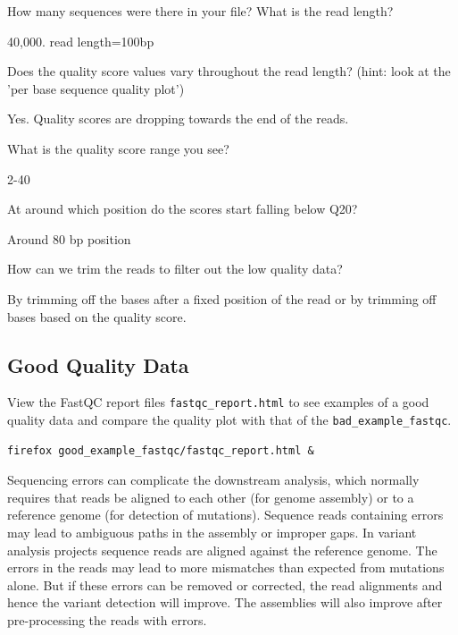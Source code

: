 \begin{questions}
How many sequences were there in your file? What is the read length?
\begin{answer}
40,000. read length=100bp
\end{answer}

Does the quality score values vary throughout the read length?
(hint: look at the 'per base sequence quality plot')
\begin{answer}
Yes. Quality scores are dropping towards the end of the reads.
\end{answer}

What is the quality score range you see?
\begin{answer}
2-40
\end{answer}

At around which position do the scores start falling below Q20? 
\begin{answer}
Around 80 bp position
\end{answer}


How can we trim the reads to filter out the low quality data?
\begin{answer}
By trimming off the bases after a fixed position of the read or by trimming off
bases based on the quality score.
\end{answer}
\end{questions}

\begin{bonus}
\subsection{Good Quality Data}
View the FastQC report files \texttt{fastqc\_report.html} to see examples of a good
quality data and compare the quality plot with that of the \texttt{bad\_example\_fastqc}.

\begin{lstlisting}
firefox good_example_fastqc/fastqc_report.html &
\end{lstlisting}
\end{bonus}

\begin{note}
Sequencing errors can complicate the downstream analysis, which normally
requires that reads be aligned to each other (for genome assembly) or to a
reference genome (for detection of mutations). Sequence reads containing errors
may lead to ambiguous paths in the assembly or improper gaps. In variant
analysis projects sequence reads are aligned against the reference genome. The
errors in the reads may lead to more mismatches than expected from
mutations alone. But if these errors can be removed or corrected, the read
alignments and hence the variant detection will improve. The assemblies will also
improve after pre-processing the reads with errors.
\end{note}

